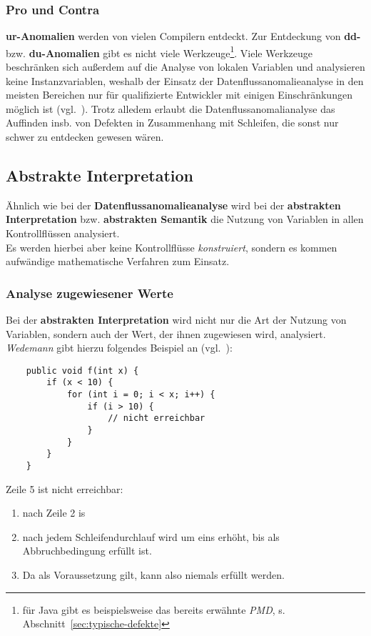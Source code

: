 \subsubsection*{Pro und Contra}
\textbf{ur-Anomalien} werden von vielen Compilern entdeckt.
Zur Entdeckung von \textbf{dd-} bzw. \textbf{du-Anomalien} gibt es nicht viele Werkzeuge\footnote{
für Java gibt es beispielsweise das bereits erwähnte \textit{PMD}, s. Abschnitt~\ref{sec:typische-defekte}
}.
Viele Werkzeuge beschränken sich außerdem auf die Analyse von lokalen Variablen und analysieren keine Instanzvariablen, weshalb der Einsatz der Datenflussanomalieanalyse in den meisten Bereichen nur für qualifizierte Entwickler mit einigen Einschränkungen möglich ist (vgl.~\cite[36]{Wed09c}).
Trotz alledem erlaubt die Datenflussanomalianalyse das Auffinden insb. von Defekten in Zusammenhang mit Schleifen, die sonst nur schwer zu entdecken gewesen wären.

\subsection{Abstrakte Interpretation}\label{subsec:abstrakte-interpretation}
Ähnlich wie bei der \textbf{Datenflussanomalieanalyse} wird bei der \textbf{abstrakten Interpretation} bzw. \textbf{abstrakten Semantik} die Nutzung von Variablen in allen Kontrollflüssen analysiert.\\
Es werden hierbei aber keine Kontrollflüsse \textit{konstruiert}, sondern es kommen aufwändige mathematische Verfahren zum Einsatz.

\subsubsection*{Analyse zugewiesener Werte}
Bei der \textbf{abstrakten Interpretation} wird nicht nur die Art der Nutzung von Variablen, sondern auch der Wert, der ihnen zugewiesen wird, analysiert.\\
\textit{Wedemann} gibt hierzu folgendes Beispiel an (vgl.~\cite[36]{Wed09c}):

\begin{verbatim}
    public void f(int x) {
        if (x < 10) {
            for (int i = 0; i < x; i++) {
                if (i > 10) {
                    // nicht erreichbar
                }
            }
        }
    }
\end{verbatim}

\noindent
Zeile 5 ist nicht erreichbar:

\begin{enumerate}
    \item nach Zeile 2 is 
    \item nach jedem Schleifendurchlauf wird  um eins erhöht, bis  als Abbruchbedingung erfüllt ist.
    \item[] Da  als Voraussetzung gilt, kann also  niemals erfüllt werden.
\end{enumerate}


